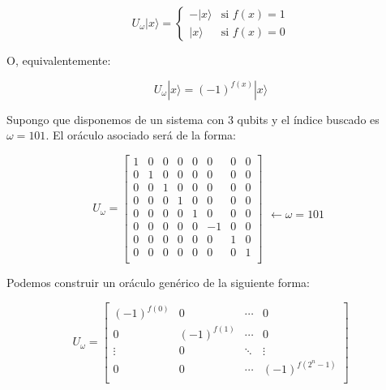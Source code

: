 \documentclass[11pt]{article}
\newcommand{\ra}{\rangle}
\theoremstyle{plain}
\begin{document}
\[
	U_\omega|x\ra = 
	\begin{cases}
		-|x\ra & \text{si } f(x) = 1 \\
		|x\ra  & \text{si } f(x) = 0
	\end{cases}
\]

O, equivalentemente:

\[
	U_\omega|x\ra = (-1)^{f(x)}|x\ra
\]
	
Supongo que disponemos de un sistema con 3 qubits y el índice buscado es $\omega = 101$. El oráculo asociado será de la forma:

\[
	U_\omega = 
	\begin{bmatrix}
		1 & 0 & 0 & 0 & 0 & 0 & 0 & 0 \\
		0 & 1 & 0 & 0 & 0 & 0 & 0 & 0 \\
		0 & 0 & 1 & 0 & 0 & 0 & 0 & 0 \\
		0 & 0 & 0 & 1 & 0 & 0 & 0 & 0 \\
		0 & 0 & 0 & 0 & 1 & 0 & 0 & 0 \\
		0 & 0 & 0 & 0 & 0 & -1 & 0 & 0 \\
		0 & 0 & 0 & 0 & 0 & 0 & 1 & 0 \\
		0 & 0 & 0 & 0 & 0 & 0 & 0 & 1 \\
	\end{bmatrix}
	\begin{aligned}
		\\
		\\
		\\
		\\
		\\
		\\
		\leftarrow \omega = \text{101}\\
		\\
		\\
		\\
	\end{aligned}
\]

Podemos construir un oráculo genérico de la siguiente forma:
	
\[
	U_\omega = 
	\begin{bmatrix}
	(-1)^{f(0)} &   0         & \cdots &   0         \\
	0           & (-1)^{f(1)} & \cdots &   0         \\
	\vdots      &   0         & \ddots & \vdots      \\
	0           &   0         & \cdots & (-1)^{f(2^n-1)} \\
	\end{bmatrix}
\]
\end{document}
